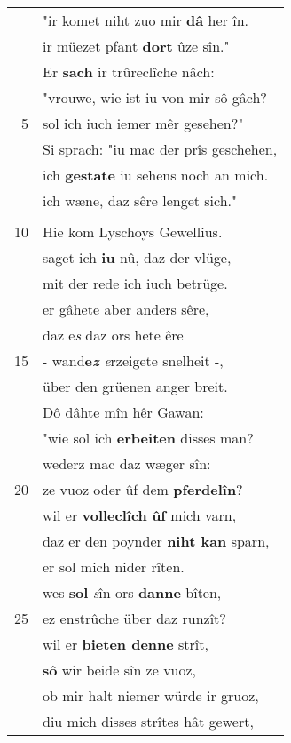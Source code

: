 \documentclass[8pt,a4paper,notitlepage]{article}
\begin{document}
\begin{table}[ht]
\begin{minipage}[t]{0.5\linewidth}
\begin{center}
\end{center}
\begin{tabular}{rl}
 & "ir komet niht zuo mir \textbf{dâ} her în.\\ 
 & ir müezet pfant \textbf{dort} ûze sîn."\\ 
 & Er \textbf{sach} ir trûreclîche nâch:\\ 
 & "vrouwe, wie ist iu von mir sô gâch?\\ 
5 & sol ich iuch iemer mêr gesehen?"\\ 
 & Si sprach: "iu mac der prîs geschehen,\\ 
 & ich \textbf{gestate} iu sehens noch an mich.\\ 
 & ich wæne, daz sêre lenget sich."\\ 
 & \textit{\begin{large}D\end{large}}iu vrouwe \textbf{schiet von im} alsus.\\ 
10 & Hie kom Lyschoys Gewellius.\\ 
 & saget ich \textbf{iu} nû, daz der vlüge,\\ 
 & mit der rede ich iuch betrüge.\\ 
 & er gâhete aber anders sêre,\\ 
 & daz e\textit{s} daz ors hete êre\\ 
15 & - wand\textbf{e\textit{z}} \textit{e}rzeigete snelheit -,\\ 
 & über den grüenen anger breit.\\ 
 & Dô dâhte mîn hêr Gawan:\\ 
 & "wie sol ich \textbf{erbeiten} disses man?\\ 
 & wederz mac daz wæger sîn:\\ 
20 & ze vuoz oder ûf dem \textbf{pferdelîn}?\\ 
 & wil er \textbf{volleclîch} \textbf{ûf} mich varn,\\ 
 & daz er den poynder \textbf{niht kan} sparn,\\ 
 & er sol mich nider rîten.\\ 
 & wes \textbf{sol} \textit{s}în ors \textbf{danne} bîten,\\ 
25 & ez enstrûche über daz runzît?\\ 
 & wil er \textbf{bieten denne} strît,\\ 
 & \textbf{sô} wir beide sîn ze vuoz,\\ 
 & ob mir halt niemer würde ir gruoz,\\ 
 & diu mich disses strîtes hât gewert,\\ 

\end{tabular}
\end{minipage}
\end{table}
\end{document}
